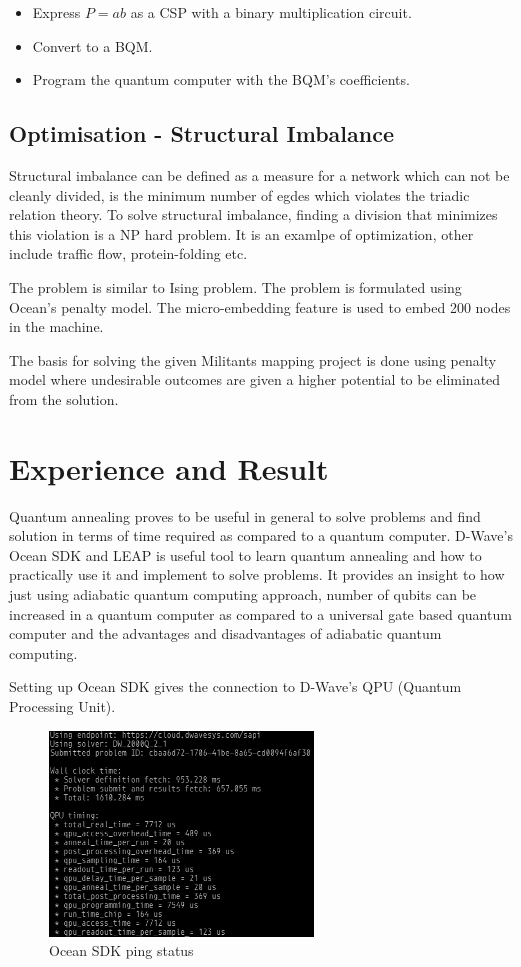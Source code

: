 \documentclass[12pt,conference]{IEEEtran}
\begin{document}
\begin{itemize}
  \item Express $P=ab$ as a CSP with a binary multiplication circuit.
  \item Convert to a BQM.
  \item Program the quantum computer with the BQM's coefficients.
\end{itemize}


\subsection{Optimisation - Structural Imbalance}
Structural imbalance can be defined as a measure for a network which can not be cleanly divided, is the minimum number of egdes which violates the triadic relation theory. 
To solve structural imbalance, finding a division that minimizes this violation is a NP hard problem. It is an examlpe of optimization, other include traffic flow, protein-folding etc.

The problem is similar to Ising problem. The problem is formulated using Ocean's penalty model. The micro-embedding feature is used to embed 200 nodes in the machine.

The basis for solving the given Militants mapping project is done using penalty model where undesirable outcomes are given a higher potential to be eliminated from the solution. 


\section{Experience and Result}
Quantum annealing proves to be useful in general to solve problems and find solution in terms of time required as compared to a quantum computer. D-Wave's Ocean SDK and LEAP is useful tool to learn quantum annealing and how to practically use it and implement to solve problems. It provides an insight to how just using adiabatic quantum computing approach, number of qubits can be increased in a quantum computer as compared to a universal gate based quantum computer and the advantages and disadvantages of adiabatic quantum computing. 

Setting up Ocean SDK gives the connection to D-Wave's QPU (Quantum Processing Unit).

\begin{figure}[h]
  \centering
  \includegraphics[width=7cm]{sdk.png}
  \caption{Ocean SDK ping status}
  \label{fig:OSDK}
\end{figure}
\end{document}
